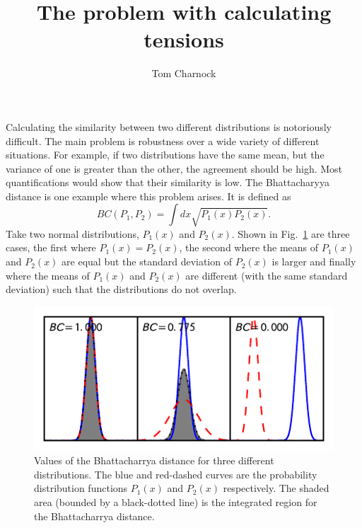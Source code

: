 \documentclass[twocolumn]{revtex4-1}
\begin{document}
\title{The problem with calculating tensions}
\author{Tom Charnock}
\maketitle

    Calculating the similarity between two different distributions is notoriously difficult.
    The main problem is robustness over a wide variety of different situations.
    For example, if two distributions have the same mean, but the variance of one is greater than the other, the agreement should be high.
    Most quantifications would show that their similarity is low.
    The Bhattacharyya distance is one example where this problem arises.
    It is defined as 
    \begin{equation}
        BC(P_1, P_2) = \int dx \sqrt{P_1(x)P_2(x)}.
    \end{equation}
    Take two normal distributions, $P_1(x)$ and $P_2(x)$.
    Shown in Fig.~\ref{fig:bhattacharrya} are three cases, the first where $P_1(x) = P_2(x)$, the second where the means of $P_1(x)$ and $P_2(x)$ are equal but the standard deviation of $P_2(x)$ is larger and finally where the means of $P_1(x)$ and $P_2(x)$ are different (with the same standard deviation) such that the distributions do not overlap.
    \begin{figure}
        \centering
        \includegraphics{../comparison/plots/Bhattacharrya.pdf}
        \caption{Values of the Bhattacharrya distance for three different distributions.
                 The blue and red-dashed curves are the probability distribution functions $P_1(x)$ and $P_2(x)$ respectively.
                 The shaded area (bounded by a black-dotted line) is the integrated region for the Bhattacharrya distance.}
        \label{fig:bhattacharrya}
    \end{figure}
\end{document}
